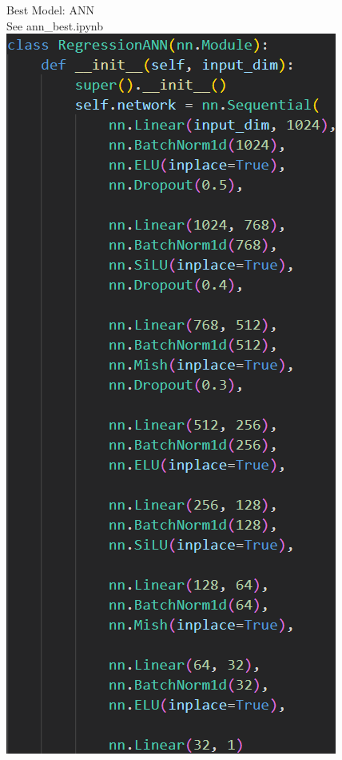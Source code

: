 \documentclass{beamer}
\begin{document}
\begin{frame}
    \begin{figure}
        \begin{minipage}[b]{0.28\textwidth}
            {\footnotesize Best Model: ANN\\See ann\_best.ipynb}
            \center
            \includegraphics[width=\linewidth]{figure/nn.png}

\end{minipage}
\end{figure}
\end{frame}
\end{document}
